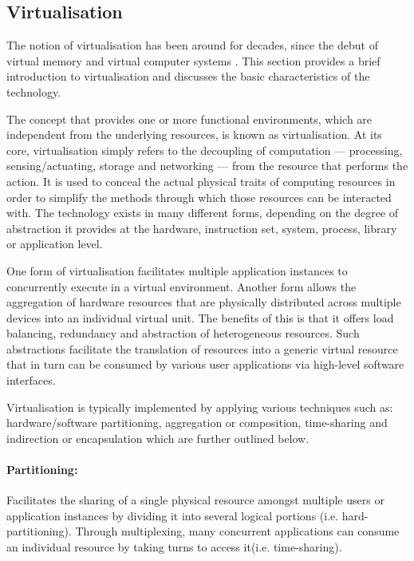 \subsection{Virtualisation}
The notion of virtualisation has been around for decades, since the debut of virtual memory \cite{denning1970virtual} and virtual computer systems \cite{goldberg1973architectural}.
This section provides a brief introduction to virtualisation and discusses the basic characteristics of the technology.

The concept that provides one or more functional environments, which are independent from the underlying resources, is known as virtualisation. At its core, virtualisation simply refers to the decoupling of computation — processing, sensing/actuating, storage and networking — from the resource that performs the action. It is used to conceal the actual physical traits of computing resources in order to simplify the methods through which those resources can be interacted with. The technology exists in many different forms, depending on the degree of abstraction it provides at the hardware, instruction set, system, process, library or application level. 


One form of virtualisation facilitates multiple application instances to concurrently execute in a virtual environment. Another form allows the aggregation of hardware resources that are physically distributed across multiple devices into an individual virtual unit. The benefits of this is that it offers load balancing, redundancy and abstraction of heterogeneous resources. Such abstractions facilitate the translation of resources into a generic virtual resource that in turn can be consumed by various user applications via high-level software interfaces. 


Virtualisation is typically implemented by applying various techniques such as: hardware/software partitioning, aggregation or composition, time-sharing and indirection or encapsulation \cite{fortes2005guest} which are further outlined below.

\paragraph{Partitioning:} Facilitates the sharing of a single physical resource amongst multiple users or application instances by dividing it into several logical portions (i.e. hard-partitioning). Through multiplexing, many concurrent applications can consume an individual resource by taking turns to access it(i.e. time-sharing).   

